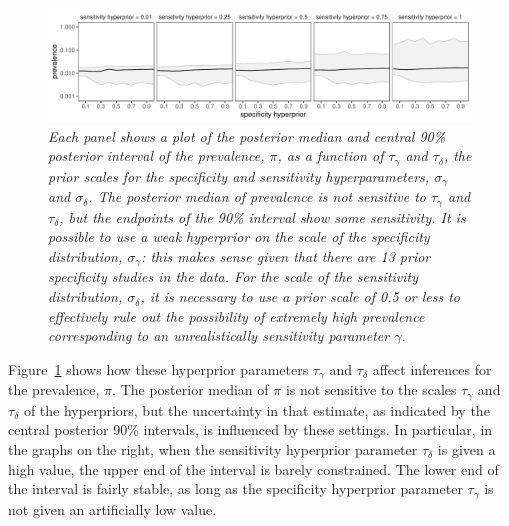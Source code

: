 \documentclass[11pt]{article}
\begin{document}
\begin{figure}
  \centerline{\includegraphics[width=\textwidth]{prior-sensitivity.pdf}}
  \vspace{-.15in}
\caption{\em Each panel shows a plot of the posterior median and central 90\%
  posterior interval of the prevalence, $\pi$, as a function of $\tau_{\gamma}$ and $\tau_{\delta}$, the prior scales for the specificity  and sensitivity
  hyperparameters, $\sigma_{\gamma}$ and $\sigma_{\delta}$.
  The posterior median of prevalence is not sensitive to $\tau_{\gamma}$ and $\tau_{\delta}$, but the endpoints of the 90\% interval show some sensitivity.  It is possible to use a weak hyperprior on the scale of the specificity distribution,  $\sigma_{\gamma}$:  this makes sense given that there are 13 prior specificity studies in the data.  For the scale of the sensitivity distribution,  $\sigma_{\delta}$, it is necessary to use a prior scale of 0.5 or less to effectively rule out the possibility of extremely high prevalence  corresponding to an unrealistically sensitivity parameter $\gamma$.}\label{prior-sensitivity.fig}
\end{figure}

Figure~\ref{prior-sensitivity.fig} shows how these hyperprior parameters $\tau_{\gamma}$ and $\tau_{\delta}$ affect inferences for the prevalence, $\pi$.
The posterior median of $\pi$ is not sensitive to the scales
 $\tau_{\gamma}$ and $\tau_{\delta}$ of the hyperpriors, but the
uncertainty in that estimate, as indicated by the central posterior 90\%
intervals, is influenced by these settings.  In particular, in the graphs on the right, when the sensitivity hyperprior parameter $\tau_{\delta}$ is given a high value, the upper end of the interval is barely constrained.  The lower end of the interval is fairly stable, as long as the specificity hyperprior parameter $\tau_{\gamma}$ is not given an artificially low value.
\end{document}
